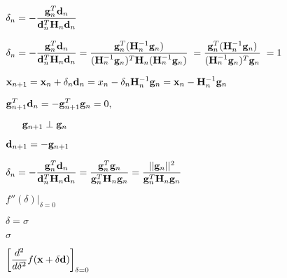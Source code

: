 \documentclass{article}
\def\lthtmlcheckvsize{\ifdim\ht\sizebox<\vsize 
  \ifdim\wd\sizebox<\hsize\expandafter\hfill\fi \expandafter\vfill
  \else\expandafter\vss\fi}%
\begin{document}
{\newpage\clearpage
{}%
$\displaystyle \delta_n=-\frac{{\bf g}^T_n{\bf d}_n}{{\bf d}^T_n{\bf H}_n{\bf d}_n}$%
\lthtmlindisplaymathZ
\lthtmlcheckvsize\clearpage}

{\newpage\clearpage
{}%
$\displaystyle \delta_n=-\frac{{\bf g}_n^T{\bf d}_n}{{\bf d}_n^T{\bf H}_n{\bf d}_n}
=\frac{{\bf g}^T_n({\bf H}_n^{-1}{\bf g}_n)}
{({\bf H}_n^{-1}{\bf g}_n)^T{\bf H}_n({\bf H}^{-1}_n{\bf g}_n)}\;
=\frac{{\bf g}^T_n({\bf H}_n^{-1}{\bf g}_n)}
{({\bf H}_n^{-1}{\bf g}_n)^T{\bf g}_n}\;=1$%
\lthtmlindisplaymathZ
\lthtmlcheckvsize\clearpage}

{\newpage\clearpage
{}%
$\displaystyle {\bf x}_{n+1}={\bf x}_n+\delta_n{\bf d}_n
=x_n-\delta_n{\bf H}^{-1}_n{\bf g}_n={\bf x}_n-{\bf H}^{-1}_n{\bf g}_n$%
\lthtmlindisplaymathZ
\lthtmlcheckvsize\clearpage}

{\newpage\clearpage
{}%
$\displaystyle {\bf g}^T_{n+1}{\bf d}_n=-{\bf g}^T_{n+1}{\bf g}_n=0,
\;\;\;\;\;$%
\lthtmlindisplaymathZ
\lthtmlcheckvsize\clearpage}

{\newpage\clearpage
{}%
$\displaystyle \;\;\;\;\;\; {\bf g}_{n+1}\perp{\bf g}_n$%
\lthtmlindisplaymathZ
\lthtmlcheckvsize\clearpage}

{\newpage\clearpage
{}%
$ {\bf d}_{n+1}=-{\bf g}_{n+1}$%
\lthtmlindisplaymathZ
\lthtmlcheckvsize\clearpage}

{\newpage\clearpage
{}%
$\displaystyle \delta_n=-\frac{{\bf g}_n^T{\bf d}_n}{{\bf d}_n^T{\bf H}_n{\bf d}_n}
=\frac{{\bf g}_n^T{\bf g}_n}{{\bf g}_n^T{\bf H}_n{\bf g}_n}
=\frac{||{\bf g}_n||^2}{{\bf g}_n^T{\bf H}_n{\bf g}_n}$%
\lthtmlindisplaymathZ
\lthtmlcheckvsize\clearpage}

{\newpage\clearpage
{}%
$ f''(\delta)\big|_{\delta=0}$%
\lthtmlindisplaymathZ
\lthtmlcheckvsize\clearpage}

{\newpage\clearpage
{}%
$ \delta=\sigma$%
\lthtmlindisplaymathZ
\lthtmlcheckvsize\clearpage}

{\newpage\clearpage
{}%
$ \sigma$%
\lthtmlindisplaymathZ
\lthtmlcheckvsize\clearpage}

{\newpage\clearpage
{}%
$\displaystyle \left[\frac{d^2}{d\delta^2} f({\bf x}+\delta{\bf d})\right]_{\delta=0}$%
\lthtmlindisplaymathZ
\lthtmlcheckvsize\clearpage}
\end{document}
